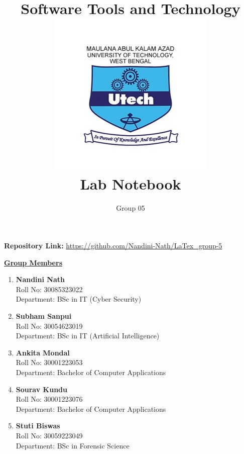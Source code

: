 \documentclass[12pt, a4paper]{article}
\title{
    \vspace{-2cm}
    \Huge \textbf{\color{black!60} Software Tools and Technology}\\[0.5cm]
    \includegraphics[width=0.3\linewidth]{Makaut.png}\\[0.5cm]
    \LARGE \textbf{\color{black} Lab Notebook}
}
\author{
    \vspace{1cm}
    \Large Group 05
}
\date{} %
\begin{document}
\maketitle
{}


\vspace{-1cm}
\begin{center}
\textbf{Repository Link:} \href{https://github.com/Nandini-Nath/LaTex_group-5}{\textcolor{blue!60}{https://github.com/Nandini-Nath/LaTex\_group-5}}
\end{center}

\vspace{1cm}

\centering
\bfseries{\underline{\Large \textcolor{blue!60}{Group Members}}}
\vspace{0.5cm}

\begin{flushleft}
\begin{enumerate}
    \item \textbf{Nandini Nath} \\
    Roll No: 30085323022 \\
    Department: BSc in IT (Cyber Security)
    
    \item \textbf{Subham Sanpui} \\
    Roll No: 30054623019 \\
    Department: BSc in IT (Artificial Intelligence)
    
    \item \textbf{Ankita Mondal} \\
    Roll No: 30001223053 \\
    Department: Bachelor of Computer Applications
    
    \item \textbf{Sourav Kundu} \\
    Roll No: 30001223076 \\
    Department: Bachelor of Computer Applications
    
    \item \textbf{Stuti Biswas} \\
    Roll No: 30059223049 \\
    Department: BSc in Forensic Science
\end{enumerate}
\end{flushleft}
\end{document}
